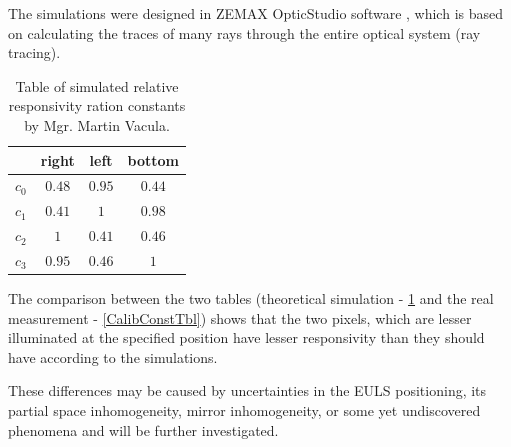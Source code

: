 \par
The simulations were designed in ZEMAX OpticStudio software \cite{zemax}, which is based on calculating the traces of many rays through the entire optical system (ray tracing).



\begin{table}[H]
\centering
\begin{tabular}{|c|c|c|c|}
\hline
   & right & left & bottom \\ \hline
$c_0$ & $0.48$    & $0.95$   & $0.44$     \\ \hline
$c_1$ & $0.41$    & $1$   	 & $0.98$      \\ \hline
$c_2$ & $1$    	  & $0.41$   & $0.46$      \\ \hline
$c_3$ & $0.95$    & $0.46$   & $1$      \\ \hline
\end{tabular}
\caption{Table of simulated relative responsivity ration constants by Mgr. Martin Vacula.}
 \label{CalibConstTblSim}
\end{table}

The comparison between the two tables (theoretical simulation - \ref{CalibConstTblSim} and the real measurement - \ref{CalibConstTbl}) shows that the two pixels, which are lesser illuminated at the specified position have lesser responsivity than they should have according to the simulations.

\par
These differences may be caused by uncertainties in the EULS positioning, its partial space inhomogeneity, mirror inhomogeneity, or some yet undiscovered phenomena and will be further investigated.





